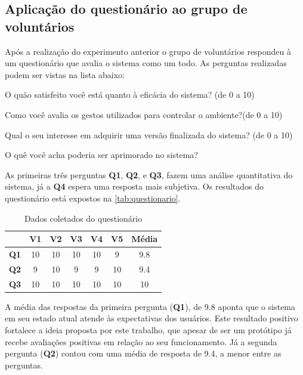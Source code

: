 
\subsection{Aplicação do questionário ao grupo de voluntários}

Após a realização do experimento anterior o grupo de voluntários respondeu à um questionário que avalia o sistema como um todo. As perguntas realizadas podem ser vistas na lista abaixo:

\begin{description}[noitemsep]
    \item [Q1] O quão satisfeito você está quanto à eficácia do sistema? (de 0 a 10)
    \item [Q2] Como você avalia os gestos utilizados para controlar o ambiente?(de 0 a 10)
    \item [Q3] Qual o seu interesse em adquirir uma versão finalizada do sistema? (de 0 a 10)
    \item [Q4] O quê você acha poderia ser aprimorado no sistema?
\end{description}

As primeiras três perguntas \textbf{Q1}, \textbf{Q2}, e \textbf{Q3}, fazem uma análise quantitativa do sistema, já a \textbf{Q4} espera uma resposta mais subjetiva. Os resultados do questionário está expostos na \autoref{tab:questionario}.

\begin{table}[ht]
    \centering
    \begin{tabular}{c|c|c|c|c|c||c|}
        \cline{2-7}
         & \textbf{V1} & \textbf{V2} & \textbf{V3} & \textbf{V4} & \textbf{V5} & \textbf{Média} \\ \hline
        \multicolumn{1}{|c|}{\textbf{Q1}} & 10 & 10 & 10 & 10 & 9 & 9.8 \\ \hline
        \multicolumn{1}{|c|}{\textbf{Q2}} & 9 & 10 & 9 & 9 & 10 & 9.4 \\ \hline
        \multicolumn{1}{|c|}{\textbf{Q3}} & 10 & 10 & 10 & 10 & 10 & 10 \\ \hline
    \end{tabular}
    \caption{Dados coletados do questionário}
    \label{tab:questionario}
\end{table}

A média das respostas da primeira pergunta (\textbf{Q1}), de 9.8 aponta que o sistema em seu estado atual atende às expectativas dos usuários. Este resultado positivo fortalece a ideia proposta por este trabalho, que apesar de ser um protótipo já recebe avaliações positivas em relação ao seu funcionamento. Já a segunda pergunta (\textbf{Q2}) contou com uma média de resposta de 9.4, a menor entre as perguntas. 

